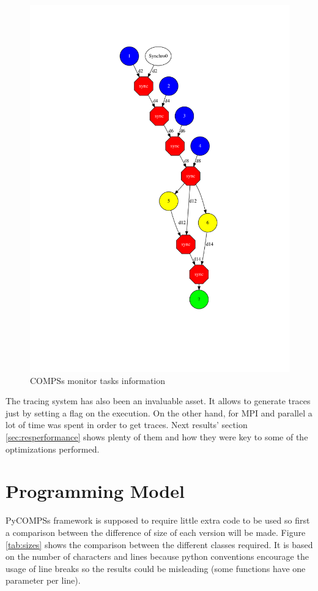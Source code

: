  \begin{figure}[h]
 \includegraphics[height=\textheight]{img/main_01_completeGraph.png}
 \caption{COMPSs monitor tasks information}
 \label{fig:monitor}
 \end{figure}
 
 
 The tracing system has also been an invaluable asset. It allows to generate traces just by setting a flag on the execution. On the other hand, for MPI and parallel a lot of time was spent in order to get traces. Next results' section \ref{sec:resperformance} shows plenty of them and how they were key to some of the optimizations performed.

\section{Programming Model}

PyCOMPSs framework is supposed to require little extra code to be used so first a comparison between the difference of size of each version will be made. Figure \ref{tab:sizes} shows the comparison between the different classes required. It is based on the number of characters and lines because python conventions encourage the usage of line breaks so the results could be misleading (some functions have one parameter per line).


